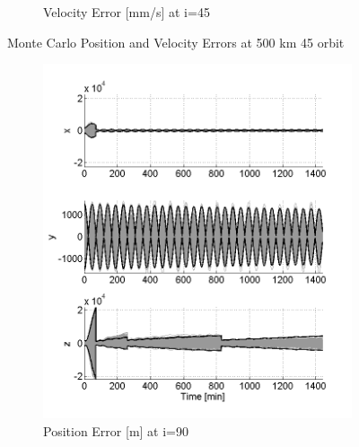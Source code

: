 \documentclass[]{aiaa-tc}%
\begin{document}
\begin{figure}[h!]
\begin{subfigure}{.49\textwidth}
		\caption{Velocity Error [mm/s] at i=45\degree}
		\label{fig:mcvel45_500}
	\end{subfigure}
	\caption{Monte Carlo Position and Velocity Errors at 500 km 45 \degree orbit}
	\label{fig:mc45_500}
\end{figure}
%
%
\begin{figure}[h!]
	\centering
	\begin{subfigure}{.49\textwidth}
		\centering
		\includegraphics{MC_pos90_500}
		\caption{Position Error [m] at i=90\degree}
		\label{fig:mcposl90_500}
	\end{subfigure}%
	\begin{subfigure}{.49\textwidth} 
		\centering

\end{subfigure}
\end{figure}
\end{document}
